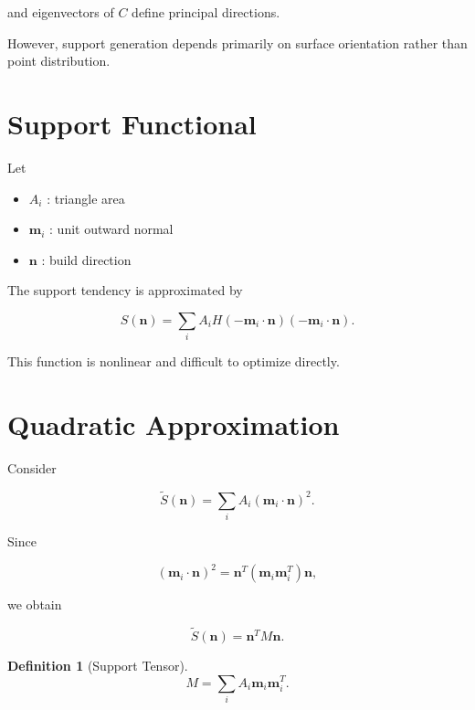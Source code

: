\documentclass[journal,11pt]{article}
\newtheorem{definition}{Definition}
\begin{document}
and eigenvectors of $C$ define principal directions.

However, support generation depends primarily on surface orientation rather than point distribution.

\section{Support Functional}

Let

\begin{itemize}
\item $A_i$ : triangle area
\item $\mathbf m_i$ : unit outward normal
\item $\mathbf n$ : build direction
\end{itemize}

The support tendency is approximated by

\begin{equation}
S(\mathbf n)
=
\sum_i
A_i
H(-\mathbf m_i\cdot \mathbf n)
(-\mathbf m_i\cdot \mathbf n).
\end{equation}

This function is nonlinear and difficult to optimize directly.

\section{Quadratic Approximation}

Consider

\begin{equation}
\widetilde S(\mathbf n)
=
\sum_i
A_i
(\mathbf m_i\cdot\mathbf n)^2.
\end{equation}

Since

\begin{equation}
(\mathbf m_i\cdot\mathbf n)^2
=
\mathbf n^T
(\mathbf m_i\mathbf m_i^T)
\mathbf n,
\end{equation}

we obtain

\begin{equation}
\widetilde S(\mathbf n)
=
\mathbf n^T M \mathbf n.
\end{equation}

\begin{definition}[Support Tensor]
\begin{equation}
M
=
\sum_i
A_i
\mathbf m_i\mathbf m_i^T.
\end{equation}
\end{definition}
\end{document}
